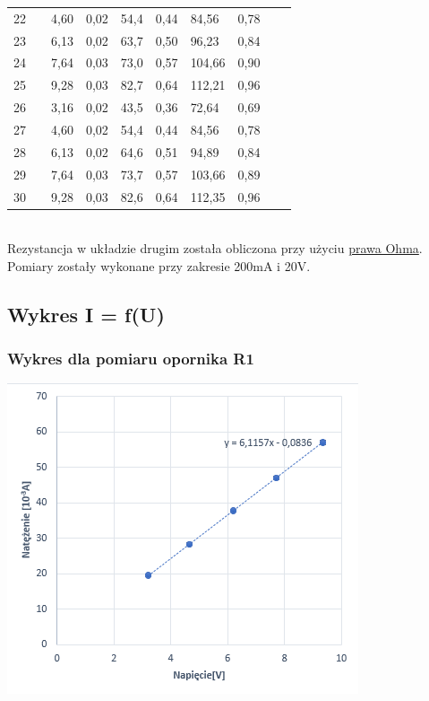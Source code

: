 \documentclass[12pt]{article}
\begin{document}
\begin{adjustbox}{center}
\begin{tabular}{|p{0.5cm}|p{1.5cm}|p{1cm}|p{1.5cm}|p{1.5cm}|p{2cm}|p{1.3cm}|p{1.2cm}|p{1.5cm}|p{1.5cm}|}
    22 && 4,60 & 0,02 & 54,4 & 0,44 & 84,56& 0,78  && \\
    23 && 6,13 & 0,02 & 63,7 & 0,50 & 96,23& 0,84  && \\
    24 && 7,64 & 0,03 & 73,0 & 0,57 & 104,66& 0,90  && \\
    25 && 9,28 & 0,03 & 82,7 & 0,64 & 112,21& 0,96  && \\
    26 && 3,16 & 0,02 & 43,5 & 0,36 & 72,64& 0,69   &&\\
    27 && 4,60 & 0,02 & 54,4 & 0,44 & 84,56& 0,78   &&\\
    28 && 6,13 & 0,02 & 64,6 & 0,51 & 94,89& 0,84  && \\
    29 && 7,64 & 0,03 & 73,7 & 0,57 & 103,66& 0,89  && \\
    30 && 9,28 & 0,03 & 82,6 & 0,64 & 112,35& 0,96 && \\
    \hline
\end{tabular}
\end{adjustbox}\\

Rezystancja w układzie drugim została obliczona przy użyciu \hyperlink{ohm}{prawa Ohma}.
Pomiary zostały wykonane przy zakresie 200mA i 20V.

\subsection{Wykres I = f(U)}

\subsubsection{Wykres dla pomiaru opornika R1}
\includegraphics{pomiar1.png}
\end{document}
